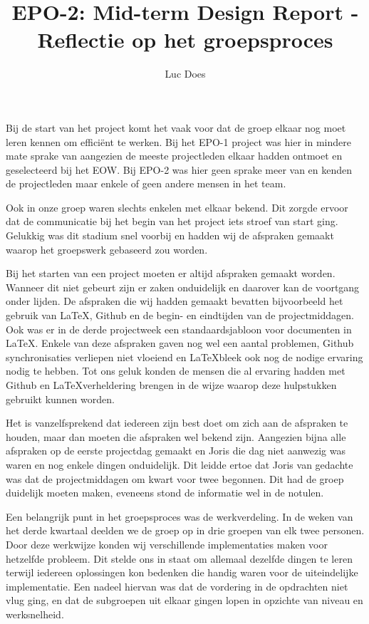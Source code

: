 \documentclass{report}
\title{EPO-2: Mid-term Design Report - Reflectie op het groepsproces}
\author{Luc Does}
\begin{document}
Bij de start van het project komt het vaak voor dat de groep elkaar nog moet leren kennen om efficiënt te werken. Bij het EPO-1 project was hier in mindere mate sprake van aangezien de meeste projectleden elkaar hadden ontmoet en geselecteerd bij het EOW. Bij EPO-2 was hier geen sprake meer van en kenden de projectleden maar enkele of geen andere mensen in het team.
\newline

Ook in onze groep waren slechts enkelen met elkaar bekend. Dit zorgde ervoor dat de communicatie bij het begin van het project iets stroef van start ging. Gelukkig was dit stadium snel voorbij en hadden wij de afspraken gemaakt waarop het groepswerk gebaseerd zou worden.
\newline

Bij het starten van een project moeten er altijd afspraken gemaakt worden. Wanneer dit niet gebeurt zijn er zaken onduidelijk en daarover kan de voortgang onder lijden. De afspraken die wij hadden gemaakt bevatten bijvoorbeeld het gebruik van \LaTeX, Github en de begin- en eindtijden van de projectmiddagen. Ook was er in de derde projectweek een standaardsjabloon voor documenten in \LaTeX. Enkele van deze afspraken gaven nog wel een aantal problemen, Github synchronisaties verliepen niet vloeiend en \LaTeX bleek ook nog de nodige ervaring nodig te hebben. Tot ons geluk  konden de mensen die al ervaring hadden met Github en \LaTeX verheldering brengen in de wijze waarop deze hulpstukken gebruikt kunnen worden.
\newline

Het is  vanzelfsprekend dat iedereen zijn best doet om zich aan de afspraken te houden, maar dan moeten die afspraken wel bekend zijn. Aangezien bijna alle afspraken op de eerste projectdag gemaakt en Joris die dag niet aanwezig was waren en nog enkele dingen onduidelijk. Dit leidde ertoe dat Joris van gedachte was dat de projectmiddagen om kwart voor twee begonnen. Dit had de groep duidelijk moeten maken, eveneens stond de informatie wel in de notulen.
\newline

Een belangrijk punt in het groepsproces was de werkverdeling. In de weken van het derde kwartaal deelden we de groep op in drie groepen van elk twee personen. Door deze werkwijze konden wij verschillende implementaties maken voor hetzelfde probleem. Dit stelde ons in staat om allemaal dezelfde dingen te leren terwijl iedereen oplossingen kon bedenken die handig waren voor de uiteindelijke implementatie. Een nadeel hiervan was dat de vordering in de opdrachten niet vlug ging, en dat de subgroepen uit elkaar gingen lopen in opzichte van niveau en werksnelheid.
\end{document}
